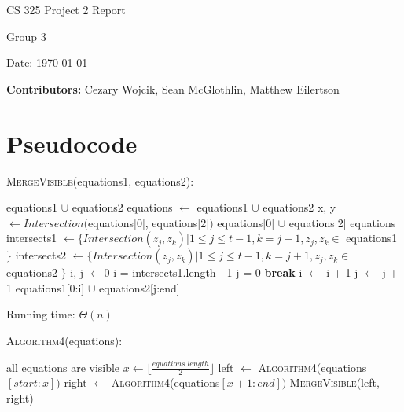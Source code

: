 \documentclass[12pt,letterpaper]{article}
\begin{document}
\begin{titlepage}
    \vspace*{4cm}
    {\huge \center
        CS 325 Project 2 Report\\[1cm]
    }
    \center
    {\large
        Group 3

        Date: \today

    \textbf{Contributors:}
    Cezary Wojcik,
    Sean McGlothlin,
    Matthew Eilertson
    }

\end{titlepage}


\section{Pseudocode}

\textsc{MergeVisible}(equations1, equations2):

\begin{algorithmic}
	\State \Return equations1 $\cup$ equations2
\EndIf
{}
	\State equations $\gets$ equations1 $\cup$ equations2
	\State x, y $\gets Intersection($equations[0], equations[2]$)$
		\State \Return equations[0] $\cup$ equations[2]
	\Else
		\State \Return equations
	\EndIf
\EndIf
\State intersects1 $\gets \{ Intersection(z_j, z_k) | 1 \leq j \leq t - 1, k = j + 1, z_j,z_k \in$ equations1 $\}$
\State intersects2 $\gets \{ Intersection(z_j, z_k) | 1 \leq j \leq t - 1, k = j + 1, z_j,z_k \in$ equations2 $\}$
\State i, j $\gets 0$
		\State i = intersects1.length - 1
		\State j = 0
		\State \textbf{break}
	\EndIf
		\State i $\gets$ i + 1
	\Else
		\State j $\gets$ j + 1
	\EndIf
\EndWhile
\State \Return equations1[0:i] $\cup$ equations2[j:end]
\end{algorithmic}

Running time: $\Theta(n)$

\textsc{Algorithm4}(equations):

\begin{algorithmic}
	\State all equations are visible
\Else
	\State $x \gets \lfloor\frac{equations.length}{2}\rfloor$
	\State left $\gets$ \textsc{Algorithm4}(equations$[start:x])$
	\State right $\gets$ \textsc{Algorithm4}(equations$[x+1:end])$
	\State \Return \textsc{MergeVisible}(left, right)
\EndIf
\end{algorithmic}
\end{document}
